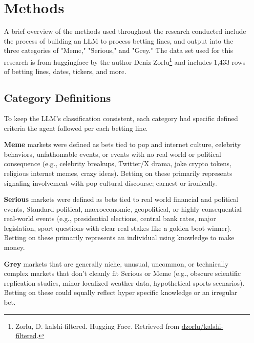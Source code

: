 \documentclass{article}
\begin{document}
\section{Methods}
A brief overview of the methods used throughout the research conducted include the process of building an LLM to process betting lines, and output into the three categories of "Meme," "Serious," and "Grey." The data set used for this research is from huggingface by the author Deniz Zorlu\footnote {Zorlu, D.
kalshi-filtered. Hugging Face. Retrieved from \url{dzorlu/kalshi-filtered}.} and includes 1,433 rows of betting lines, dates, tickers, and more.
\label{sec:headings}


\subsection{Category Definitions}
To keep the LLM's classification consistent, each category had specific defined criteria the agent followed per each betting line.

\textbf{Meme}
markets were defined as bets tied to pop and internet culture, celebrity behaviors, unfathomable events, or events with no real world or political consequence (e.g., celebrity breakups, Twitter/X drama, joke crypto tokens, religious internet memes, crazy ideas). Betting on these primarily represents signaling involvement with pop-cultural discourse; earnest or ironically.

\textbf{Serious}
markets were defined as bets tied to real world financial and political events, Standard political, macroeconomic, geopolitical, or highly consequential real-world events (e.g., presidential elections, central bank rates, major legislation, sport questions with clear real stakes like a golden boot winner). Betting on these primarily represents an individual using knowledge to make money.

\textbf{Grey}
markets that are generally niche, unusual, uncommon, or technically complex markets that don't cleanly fit Serious or Meme (e.g., obscure scientific replication studies, minor localized weather data, hypothetical sports scenarios). Betting on these could equally reflect hyper specific knowledge or an irregular bet.  

\end{document}
